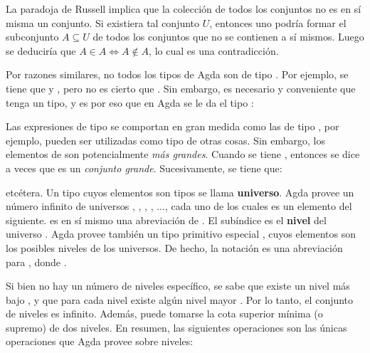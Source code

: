 La paradoja de Russell implica que la colección de todos los conjuntos no es en sí misma un conjunto. Si existiera tal conjunto $U$, entonces uno podría formar el subconjunto $A \subseteq U$ de todos los conjuntos que no se contienen a sí mismos. Luego se deduciría que $A \in A \iff A \notin A$, lo cual es una contradicción.

Por razones similares, no todos los tipos de Agda son de tipo . Por ejemplo, se tiene que  \AgdaSymbol{:}  y  \AgdaSymbol{:} , pero no es cierto que  \AgdaSymbol{:} . Sin embargo, es necesario y conveniente que  tenga un tipo, y es por eso que en Agda se le da el tipo :

 \AgdaSymbol{:} 

Las expresiones de tipo  se comportan en gran medida como las de tipo , por ejemplo, pueden ser utilizadas como tipo de otras cosas. Sin embargo, los elementos de  son potencialmente \textit{más grandes}. Cuando se tiene  \AgdaSymbol{:} , entonces se dice a veces que  es un \textit{conjunto grande}. Sucesivamente, se tiene que:

 \AgdaSymbol{:}  

 \AgdaSymbol{:} 

etcétera. Un tipo cuyos elementos son tipos se llama \textbf{universo}. Agda provee un número infinito de universos , , , , ..., cada uno de los cuales es un elemento del siguiente.  es en sí mismo una abreviación de . El subíndice  es el \textbf{nivel} del universo . Agda provee también un tipo primitivo especial , cuyos elementos son los posibles niveles de los universos. De hecho, la notación  es una abreviación para , donde  \AgdaSymbol{:} . 

Si bien no hay un número de niveles específico, se sabe que existe un nivel más bajo , y que para cada nivel  existe algún nivel mayor  . Por lo tanto, el conjunto de niveles es infinito. Además, puede tomarse la cota superior mínima (o supremo)  de dos niveles. En resumen, las siguientes operaciones son las únicas operaciones que Agda provee sobre niveles:


